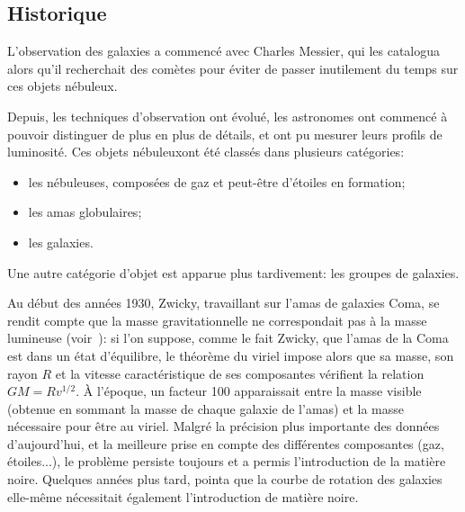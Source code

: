 		\subsection{Historique}

			L'observation des galaxies a commencé avec Charles Messier, qui les
			catalogua alors qu'il recherchait des comètes pour éviter de passer
			inutilement du temps sur ces objets \og nébuleux\fg{}.

			Depuis, les techniques d'observation ont évolué, les astronomes ont
			commencé à pouvoir distinguer de plus en plus de détails, et ont pu
			mesurer leurs profils de luminosité. Ces objets \og{}nébuleux\fg ont été classés dans
			plusieurs catégories:
			\begin{itemize}
				\item les nébuleuses, composées de gaz et peut-être d'étoiles en formation;
				\item les amas globulaires;
				\item les galaxies.
			\end{itemize}
			Une autre catégorie d'objet est apparue plus tardivement: les groupes de galaxies.

			Au début des années 1930, Zwicky, travaillant sur l'amas de galaxies Coma, se rendit compte que la masse
			gravitationnelle ne correspondait pas à la masse lumineuse (voir~\cite{1933AcHPh...6..110Z}): si l'on suppose, comme le fait
			Zwicky, que l'amas de la Coma est dans un état d'équilibre, le théorème du viriel impose alors que sa masse, son rayon
			$R$ et la vitesse caractéristique de ses composantes vérifient la relation $GM = R v^{1/2}$. À l'époque, un facteur 100
			apparaissait entre la masse visible (obtenue en sommant la masse de chaque galaxie de l'amas) et la masse nécessaire pour être
			au viriel. Malgré la précision plus importante des données d'aujourd'hui, et la meilleure prise en compte des différentes
			composantes (gaz, étoiles...), le problème persiste toujours et a permis l'introduction de la matière noire. Quelques années
			plus tard, \cite{1939LicOB..19...41B} pointa que la courbe de rotation des galaxies elle-même nécessitait également
			l'introduction de matière noire.


